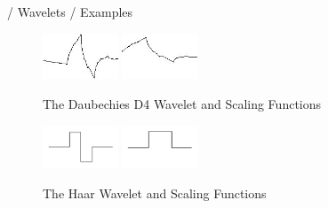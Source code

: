 \documentclass{beamer}
\def\RImageSize{0.2\textwidth}
\def\RImageSpace{\hspace{1cm}}
\begin{document}
\begin{frame}{/ Wavelets / Examples}

  \begin{figure}[hbt]
    \begin{center}
      \includegraphics[width=\RImageSize]{daubechies-d4-wavelet.jpg}
      \RImageSpace
      \includegraphics[width=\RImageSize]{daubechies-d4-scaling.jpg}
      \caption{The Daubechies D4 Wavelet and Scaling Functions}
    \end{center}
  \end{figure}

  \begin{figure}[hbt]
    \begin{center}
      \includegraphics[width=\RImageSize]{haar-wavelet.jpg}
      \RImageSpace
      \includegraphics[width=\RImageSize]{haar-scaling.jpg}
      \caption{The Haar Wavelet and Scaling Functions}
    \end{center}
  \end{figure}

\end{frame}
\end{document}
